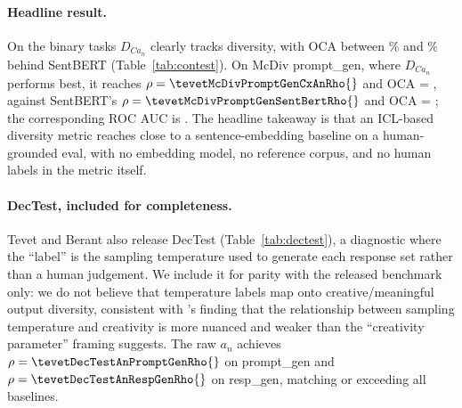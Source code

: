 \paragraph{Headline result.} On the binary tasks $D_{Ca_n}$ clearly tracks diversity, with OCA between \tevetCxAnVsSentBertOCAMinPct\% and \tevetCxAnVsSentBertOCAMaxPct\% behind SentBERT (Table~\ref{tab:contest}).
On McDiv prompt\_gen, where $D_{Ca_n}$ performs best, it reaches $\rho = \tevetMcDivPromptGenCxAnRho{}$ and OCA = \tevetMcDivPromptGenCxAnOCA{}, against SentBERT's $\rho = \tevetMcDivPromptGenSentBertRho{}$ and OCA = \tevetMcDivPromptGenSentBertOCA{}; the corresponding ROC AUC is \tevetMcDivPromptGenAUC{}.
The headline takeaway is that an ICL-based diversity metric reaches close to a sentence-embedding baseline on a human-grounded eval, with no embedding model, no reference corpus, and no human labels in the metric itself.

\paragraph{DecTest, included for completeness.} Tevet and Berant also release DecTest (Table~\ref{tab:dectest}), a diagnostic where the ``label'' is the sampling temperature used to generate each response set rather than a human judgement.
We include it for parity with the released benchmark only: we do not believe that temperature labels map onto creative/meaningful output diversity, consistent with \citet{peeperkorn2024temperature}'s finding that the relationship between sampling temperature and creativity is more nuanced and weaker than the ``creativity parameter'' framing suggests.
The raw $a_n$ achieves $\rho = \tevetDecTestAnPromptGenRho{}$ on prompt\_gen and $\rho = \tevetDecTestAnRespGenRho{}$ on resp\_gen, matching or exceeding all baselines.

\begin{table}[t]
\centering
\caption{DecTest results: Spearman $\rho$ between sampling temperature and each metric score (1000 samples, no\_hds).
Reported for parity with Tevet and Berant; the labels here are sampling temperatures rather than human judgements, so DecTest is not part of the framing for $D_{Ca_n}$.
That $a_n$ tracks temperature is mechanically unsurprising: $a_n$ is a conditional-entropy quantity, and sampling temperature directly scales the entropy of the policy, so a positive $\rho$ here is a sanity check rather than evidence about creative diversity; \citet{peeperkorn2024temperature} likewise find only a weak relationship between temperature and creativity in LLM outputs.}
\label{tab:dectest}
\small

\end{table}

